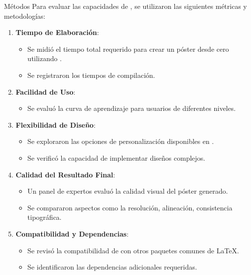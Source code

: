 \begin{block}{Métodos}
    Para evaluar las capacidades de , se utilizaron las siguientes métricas y metodologías:

    \begin{enumerate}
        \item \textbf{Tiempo de Elaboración}:
              \begin{itemize}
                  \item Se midió el tiempo total requerido para crear un póster desde cero utilizando .
                  \item Se registraron los tiempos de compilación.
              \end{itemize}

        \item \textbf{Facilidad de Uso}:
              \begin{itemize}
                  \item Se evaluó la curva de aprendizaje para usuarios de diferentes niveles.
              \end{itemize}

        \item \textbf{Flexibilidad de Diseño}:
              \begin{itemize}
                  \item Se exploraron las opciones de personalización disponibles en .
                  \item Se verificó la capacidad de implementar diseños complejos.
              \end{itemize}

        \item \textbf{Calidad del Resultado Final}:
              \begin{itemize}
                  \item Un panel de expertos evaluó la calidad visual del póster generado.
                  \item Se compararon aspectos como la resolución, alineación, consistencia tipográfica.
              \end{itemize}

        \item \textbf{Compatibilidad y Dependencias}:
              \begin{itemize}
                  \item Se revisó la compatibilidad de  con otros paquetes comunes de \LaTeX.
                  \item Se identificaron las dependencias adicionales requeridas.
              \end{itemize}


\end{enumerate}
\end{block}
